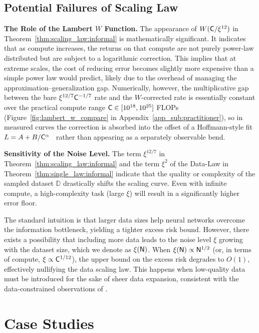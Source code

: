 \documentclass[11pt]{article}
\let\citet\citep
\theoremstyle{plain}
\begin{document}
\subsection{Potential Failures of Scaling Law}\label{sub:potential_fails}

{\bf The Role of the Lambert $W$ Function.} The appearance of $W({\sf C}/\xi^{12})$ in Theorem~\ref{thm:scaling_law:informal} is mathematically significant. It indicates that as compute increases, the returns on that compute are not purely power-law distributed but are subject to a logarithmic correction. This implies that at extreme scales, the cost of reducing error becomes slightly more expensive than a simple power law would predict, likely due to the overhead of managing the approximation--generalization gap. Numerically, however, the multiplicative gap between the bare $\xi^{12/7}{\sf C}^{-1/7}$ rate and the $W$-corrected rate is essentially constant over the practical compute range ${\sf C}\in[10^{18},10^{25}]$ FLOPs (Figure~\ref{fig:lambert_w_compare} in Appendix~\ref{app_sub:practitioner}), so in measured curves the correction is absorbed into the offset of a Hoffmann-style fit $L=A+B/{\sf C}^\alpha$~\citep{kmh+20,hbm+22} rather than appearing as a separately observable bend.

{\bf Sensitivity of the Noise Level.} The term $\xi^{12/7}$ in Theorem~\ref{thm:scaling_law:informal} and the term $\xi^2$ of the Data-Law in Theorem~\ref{thm:single_law:informal} indicate that the quality or complexity of the sampled dataset $\mathbb{D}$ drastically shifts the scaling curve. Even with infinite compute, a high-complexity task (large $\xi$) will result in a significantly higher error floor.

The standard intuition is that larger data sizes help neural networks overcome the information bottleneck, yielding a tighter excess risk bound. However, there exists a possibility that including more data leads to the noise level $\xi$ growing with the dataset size, which we denote as $\xi({\sf N})$. When $\xi({\sf N}) \propto {\sf N}^{1/2}$ (or, in terms of compute, $\xi \propto {\sf C}^{1/12}$), the upper bound on the excess risk degrades to $O(1)$, effectively nullifying the data scaling law. This happens when low-quality data must be introduced for the sake of sheer data expansion, consistent with the data-constrained observations of \citet{sos+22, mas+23}.
\section{Case Studies}\label{sec:exp}
\end{document}

